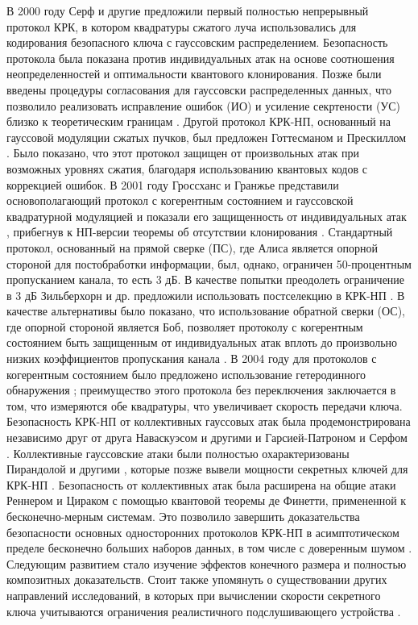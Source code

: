 В 2000 году Серф и другие \cite{cerf2001} предложили первый полностью непрерывный протокол КРК, в котором квадратуры сжатого луча использовались для кодирования безопасного ключа с гауссовским распределением. Безопасность протокола была показана против индивидуальных атак на основе соотношения неопределенностей и оптимальности квантового клонирования. Позже были введены процедуры согласования для гауссовски распределенных данных, что позволило реализовать исправление ошибок (ИО) и усиление секртености (УС)  близко к теоретическим границам \cite{vanassche2004}. Другой протокол КРК-НП, основанный на гауссовой модуляции сжатых пучков, был предложен Готтесманом и Прескиллом \cite{gottesman2001}. Было показано, что этот протокол защищен от произвольных атак при возможных уровнях сжатия, благодаря использованию квантовых кодов с коррекцией ошибок. В 2001 году Гроссханс и Гранжье представили основополагающий протокол с когерентным состоянием и гауссовской квадратурной модуляцией и показали его защищенность от индивидуальных атак \cite{grosshans2002}, прибегнув к НП-версии теоремы об отсутствии клонирования \cite{grosshans2001}. Стандартный протокол, основанный на прямой сверке (ПС), где Алиса является опорной стороной для постобработки информации, был, однако, ограничен 50-процентным пропусканием канала, то есть 3 дБ. В качестве попытки преодолеть ограничение в 3 дБ Зильберхорн и др. предложили использовать постселекцию в КРК-НП \cite{silberhorn2002}. В качестве альтернативы было показано, что использование обратной сверки (ОС), где опорной стороной является Боб, позволяет протоколу с когерентным состоянием быть защищенным от индивидуальных атак вплоть до произвольно низких коэффициентов пропускания канала \cite{grosshans2002a}. В 2004 году для протоколов с когерентным состоянием было предложено использование гетеродинного обнаружения \cite{weedbrook2004}; преимущество этого протокола без переключения заключается в том, что измеряются обе квадратуры, что увеличивает скорость передачи ключа. Безопасность КРК-НП от коллективных гауссовых атак была продемонстрирована независимо друг от друга Наваскуэсом и другими \cite{navascus2006} и Гарсией-Патроном и Серфом \cite{GarciaPatron2006}. Коллективные гауссовские атаки были полностью охарактеризованы Пирандолой и другими \cite{pirandola2008}, которые позже вывели мощности секретных ключей для КРК-НП \cite{pirandola2017,pirandola2009}. Безопасность от коллективных атак была расширена на общие атаки Реннером и Цираком \cite{renner2009} с помощью квантовой теоремы де Финетти, примененной к бесконечно-мерным системам. Это позволило завершить доказательства безопасности основных односторонних протоколов КРК-НП в асимптотическом пределе бесконечно больших наборов данных, в том числе с доверенным шумом \cite{pirandola2014, usenko2016, laudenbach2019}. Следующим развитием стало изучение эффектов конечного размера и полностью композитных доказательств. Стоит также упомянуть о существовании других направлений исследований, в которых при вычислении скорости секретного ключа учитываются ограничения реалистичного подслушивающего устройства \cite{hosseinidehaj2019, pan2020}.
